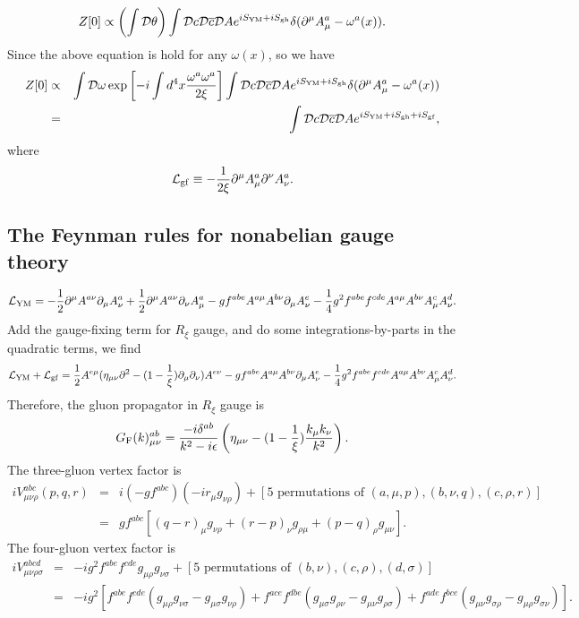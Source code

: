 \[Z[0] \propto \left(\int \mathcal{D}\theta\right) \int \mathcal{D}c \mathcal{D}\overline{c} \mathcal{D}A e^{iS_{\rm YM} + iS_{\rm gh}} \delta(\partial^{\mu}A^a_{\mu}-\omega^a(x)).\]
Since the above equation is hold for any $\omega(x)$, so we have
\begin{eqnarray}
Z[0] &\propto& \int \mathcal{D}\omega \exp \left[-i\int d^4x \frac{\omega^a\omega^a}{2\xi} \right] \int \mathcal{D}c \mathcal{D}\overline{c} \mathcal{D}A e^{iS_{\rm YM} + iS_{\rm gh}} \delta(\partial^{\mu}A^a_{\mu}-\omega^a(x)) \nonumber \\
&=&  \int \mathcal{D}c \mathcal{D}\overline{c} \mathcal{D}A e^{iS_{\rm YM} + iS_{\rm gh} + iS_{\rm gf}} , \nonumber
\end{eqnarray}
where
\[\mathcal{L}_{\rm gf} \equiv -\frac{1}{2\xi}\partial^{\mu}A^a_{\mu} \partial^{\nu}A^a_{\nu}.\]

\subsection{The Feynman rules for nonabelian gauge theory}
\[\mathcal{L}_{\rm YM} = -\frac{1}{2}\partial^{\mu}A^{a\nu} \partial_{\mu}A^a_{\nu} + \frac{1}{2}\partial^{\mu}A^{a\nu} \partial_{\nu}A^a_{\mu} -gf^{abe}A^{a\mu}A^{b\nu}\partial_{\mu}A^e_{\nu} - \frac{1}{4}g^2 f^{abe}f^{cde}A^{a\mu}A^{b\nu}A^c_{\mu}A^d_{\nu}.\]
Add the gauge-fixing term for $R_{\xi}$ gauge, and do some integrations-by-parts in the quadratic terms, we find
\[\mathcal{L}_{\rm YM} + \mathcal{L}_{\rm gf} = \frac{1}{2}A^{e\mu}(\eta_{\mu\nu}\partial^2 -(1-\frac{1}{\xi}) \partial_{\mu}\partial_{\nu})A^{e\nu} -gf^{abe}A^{a\mu}A^{b\nu}\partial_{\mu}A^e_{\nu} - \frac{1}{4}g^2 f^{abe}f^{cde}A^{a\mu}A^{b\nu}A^c_{\mu}A^d_{\nu}.\]
Therefore, the gluon propagator in $R_{\xi}$ gauge is
\[G_{\rm F}(k)^{ab}_{\mu\nu} = \frac{-i\delta^{ab}}{k^2-i\epsilon} \left( \eta_{\mu\nu} - (1 - \frac{1}{\xi}) \frac{k_{\mu}k_{\nu}}{k^2} \right).\]
The three-gluon vertex factor is
\begin{eqnarray}
iV^{abc}_{\mu\nu\rho}(p,q,r) &=& i (-gf^{abc})(-ir_{\mu}g_{\nu\rho}) + [5 \mbox{ permutations of } (a,\mu,p),(b,\nu,q),(c,\rho,r)] \nonumber \\
&=& gf^{abc}[(q-r)_{\mu}g_{\nu\rho} + (r-p)_{\nu}g_{\rho\mu} + (p-q)_{\rho}g_{\mu\nu}] .\nonumber
\end{eqnarray}
The four-gluon vertex factor is
\begin{eqnarray}
iV^{abcd}_{\mu\nu\rho\sigma} &=& -ig^2f^{abe} f^{cde} g_{\mu\rho}g_{\nu\sigma} + [5 \mbox{ permutations of } (b,\nu),(c,\rho),(d,\sigma)] \nonumber \\
&=& -ig^2 [f^{abe}f^{cde}(g_{\mu\rho}g_{\nu\sigma} - g_{\mu\sigma}g_{\nu\rho}) + f^{ace}f^{dbe}(g_{\mu\sigma}g_{\rho\nu} - g_{\mu\nu}g_{\rho\sigma}) + f^{ade}f^{bce}(g_{\mu\nu}g_{\sigma\rho} - g_{\mu\rho}g_{\sigma\nu})] .\nonumber
\end{eqnarray}

